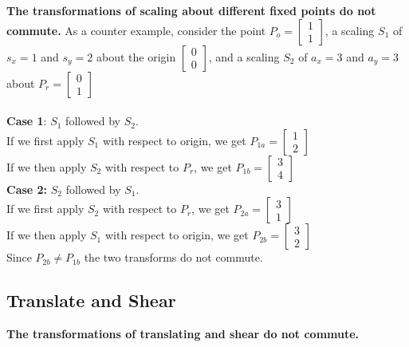 \documentclass[a4paper,10pt]{scrartcl}
\begin{document}
{\bfseries The transformations of scaling about different fixed points do not commute.} As a counter example, consider 
the point $P_o = \begin{bmatrix} 1 \\ 1 \end{bmatrix}$, a scaling $S_1$ of $s_x = 1$ and $s_y = 2$ about the origin
$\begin{bmatrix} 0 \\ 0\end{bmatrix}$, and a scaling $S_2$ of $a_x = 3$ and $a_y = 3$ about $P_r = \begin{bmatrix} 0 \\ 1\end{bmatrix}$\\\\


{\bfseries Case 1}: $S_1$ followed by $S_2$.\\
If we first apply $S_1$ with respect to origin, we get $P_{1a} = \begin{bmatrix} 1 \\ 2 \end{bmatrix}$\\
If we then apply $S_2$ with respect to $P_r$, we get $P_{1b} = \begin{bmatrix} 3 \\ 4\end{bmatrix}$\\

{\bfseries Case 2:} $S_2$ followed by $S_1$.\\
If we first apply $S_2$ with respect to $P_r$, we get $P_{2a} = \begin{bmatrix} 3 \\ 1\end{bmatrix}$\\
If we then apply $S_1$ with respect to origin, we get $P_{2b} = \begin{bmatrix} 3 \\ 2\end{bmatrix}$\\

Since $P_{2b} \neq P_{1b}$ the two transforms do not commute.

\subsection{Translate and Shear}

{\bfseries The transformations of translating and shear do not commute.}
\end{document}
